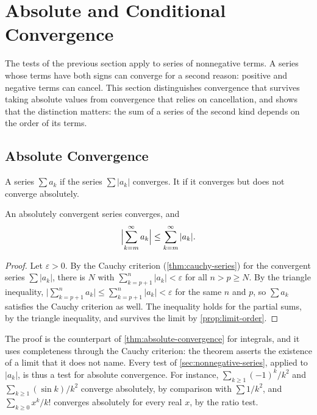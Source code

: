 \section{Absolute and Conditional Convergence}
\label{sec:absolute}

The tests of the previous section apply to series of nonnegative terms. A series whose terms have both signs can converge for a second reason: positive and negative terms can cancel. This section distinguishes convergence that survives taking absolute values from convergence that relies on cancellation, and shows that the distinction matters: the sum of a series of the second kind depends on the order of its terms.

\subsection{Absolute Convergence}

\begin{definition}
\label{def:absolute-series}
A series $\sum a_k$  if the series $\sum|a_k|$ converges. It  if it converges but does not converge absolutely.
\end{definition}

\begin{theorem}
\label{thm:absolute-series}
An absolutely convergent series converges, and
\[
\Bigl|\sum_{k=m}^\infty a_k\Bigr|\le\sum_{k=m}^\infty|a_k| .
\]
\end{theorem}

\begin{proof}
Let $\varepsilon>0$. By the Cauchy criterion (\cref{thm:cauchy-series}) for the convergent series $\sum|a_k|$, there is $N$ with $\sum_{k=p+1}^n|a_k|<\varepsilon$ for all $n>p\ge N$. By the triangle inequality, $\bigl|\sum_{k=p+1}^na_k\bigr|\le\sum_{k=p+1}^n|a_k|<\varepsilon$ for the same $n$ and $p$, so $\sum a_k$ satisfies the Cauchy criterion as well. The inequality holds for the partial sums, by the triangle inequality, and survives the limit by \cref{prop:limit-order}.
\end{proof}

The proof is the counterpart of \cref{thm:absolute-convergence} for integrals, and it uses completeness through the Cauchy criterion: the theorem asserts the existence of a limit that it does not name. Every test of \cref{sec:nonnegative-series}, applied to $|a_k|$, is thus a test for absolute convergence. For instance, $\sum_{k\ge1}(-1)^k/k^2$ and $\sum_{k\ge1}(\sin k)/k^2$ converge absolutely, by comparison with $\sum1/k^2$, and $\sum_{k\ge0}x^k/k!$ converges absolutely for every real $x$, by the ratio test.

